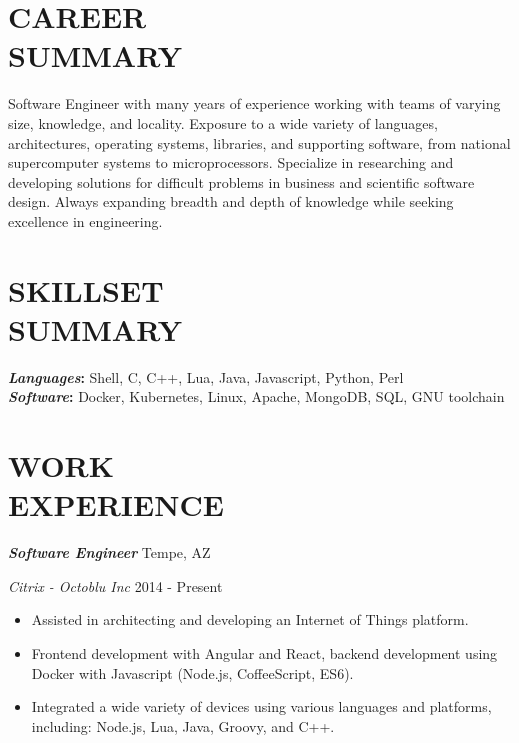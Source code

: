 \documentclass[line,margin]{res}
\renewcommand{\headrulewidth}{0pt} %
\begin{document}
\thispagestyle{empty}


\renewcommand{\headrulewidth}{0pt}

\begin{resume}

  \section{CAREER\\SUMMARY}
  Software Engineer with many years of experience working with teams of varying size, knowledge, and locality.
  Exposure to a wide variety of languages, architectures, operating systems, libraries, and supporting
  software, from national supercomputer systems to microprocessors. Specialize in researching and developing
  solutions for difficult problems in business and scientific software design. Always expanding breadth and
  depth of knowledge while seeking excellence in engineering.

  \section{SKILLSET\\SUMMARY}
          {\bf \emph{Languages}:} Shell, C, C++, Lua, Java, Javascript, Python, Perl\\ %
          {\bf \emph{Software}:} Docker, Kubernetes, Linux, Apache, MongoDB, SQL, GNU toolchain \\ %

  \section{WORK\\EXPERIENCE}
          {\bf \emph{Software Engineer}} \hfill Tempe, AZ

          {\sl Citrix - Octoblu Inc} \hfill 2014 - Present
          \begin{itemize} \itemsep -2pt
          \item
            Assisted in architecting and developing an Internet of Things platform.
          \item
            Frontend development with Angular and React, backend development using Docker with Javascript (Node.js, CoffeeScript, ES6).
          \item
            Integrated a wide variety of devices using various languages and platforms, including: Node.js, Lua, Java, Groovy, and C++.
          \end{itemize}


\end{resume}
\end{document}
